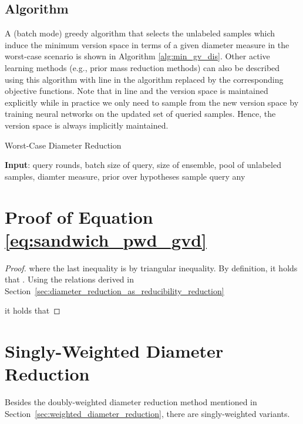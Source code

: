 \documentclass[runningheads, envcountsame, a4paper]{llncs}
\newcommand{\eg}{e.g.}
\begin{document}
\subsection{Algorithm}
A (batch mode) greedy algorithm that selects the unlabeled samples which induce the minimum version space in terms of a given diameter measure in the worst-case scenario is shown in Algorithm \ref{alg:min_gv_dis}. Other active learning methods (\eg, prior mass reduction methods) can also be described using this algorithm with line  in the algorithm replaced by the corresponding objective functions. Note that in line  and  the version space is maintained explicitly while in practice we only need to sample from the new version space by training neural networks on the updated set of queried samples. Hence, the version space is always implicitly maintained.

\begin{algorithm}
\caption{Worst-Case Diameter Reduction}
\label{alg:min_gv_dis}
\begin{algorithmic}[1]
\STATE \textbf{Input}:  query rounds,  batch size of query,  size of ensemble,  pool of unlabeled samples,  diamter measure,  prior over hypotheses
\STATE 
\STATE 
{}
    \STATE 
        \STATE sample 
        \STATE 
    \ENDFOR
        \STATE 
\STATE query 
        \STATE 
    \ENDFOR
    \STATE  
\ENDFOR
\RETURN any  
\end{algorithmic}
\end{algorithm}



\section{Proof of Equation \ref{eq:sandwich_pwd_gvd}}
\begin{proof}


where the last inequality is by triangular inequality. By definition, it holds that . Using the relations derived in Section~\ref{sec:diameter_reduction_as_reducibility_reduction}

it holds that

\end{proof}



\section{Singly-Weighted Diameter Reduction}
Besides the doubly-weighted diameter reduction method mentioned in Section~\ref{sec:weighted_diameter_reduction}, there are singly-weighted variants. 
\end{document}
